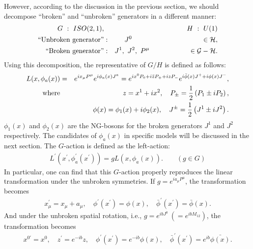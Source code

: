 \documentclass[a4paper,12pt]{article}
\begin{document}
However, according to the discussion in the previous section, 
we should decompose ``broken'' and ``unbroken'' generators in 
a different manner:
\begin{eqnarray}
G~:~ISO(2,1),&& H~:~U(1) \nonumber \\
\textrm{``Unbroken generator''} &:&J^{0} \quad 
\hspace*{3.2cm} \in {\cal H}, \nonumber \\
\textrm{``Broken generator''} &:&J^{1},~J^{2},~P^{\mu} \hspace{2cm}
\in {\cal G-H}.
\end{eqnarray}
Using this decomposition, the representative of $G/H$ is defined as
follows:
\begin{eqnarray}
L(x, \phi_{a}(x)) &=& e^{i x_{\mu} P^{\mu}} e^{i \phi_{a}(x) J^{a}}
= e^{i x^{0} P_{0} + i \bar{z} P_{+} + i z P_{-}} e^{i
\bar{\phi}(x) J^{+} + i \phi(x) J^{-}}, \label{representative} \\
\textrm{where} && z = x^{1} + i x^{2}, \quad P_{\pm} = 
\frac{1}{2} \left(P_{1}\pm i P_{2}\right), \\
&& \hspace{-0.6cm}\phi(x) = \phi_{1}(x)+ i \phi_{2}(x),
\quad J^{\pm} = \frac{1}{2} \left(J^{1}\pm i J^{2}\right).
\end{eqnarray}
$\phi_{1}(x)$ and $\phi_{2}(x)$ are the NG-bosons for the broken
generators $J^{1}$ and $J^{2}$ respectively. The candidates of
$\phi_{a}(x)$ in specific models will be discussed in the next section.
The $G$-action is defined as the left-action:
\begin{eqnarray}
L^{'}(x^{'}, \phi_{a}^{'}(x^{'})) = g L(x, \phi_{a}(x)). \qquad (g
\in G) \label{g-action}
\end{eqnarray}
In particular, one can find that this $G$-action properly 
reproduces the linear transformation under the unbroken symmetries.
If $g = e^{i a_{\mu} P^{\mu}}$, the transformation becomes
\begin{eqnarray} 
x_{\mu}^{'} = x_{\mu} + a_{\mu}, \quad \phi^{'}(x^{'}) = \phi(x),
\quad \bar{\phi}^{'}(x^{'}) = \bar{\phi}(x).
\end{eqnarray}
And under the unbroken spatial rotation, i.e., $g = e^{i b J^{0}}~(= e^{i b
M_{12}})$, the transformation becomes
\begin{eqnarray}
x^{0 '} = x^{0}, \quad z^{'} = e^{-ib} z, \quad \phi^{'}(x^{'}) =
e^{-ib} \phi(x), \quad \bar{\phi}^{'}(x^{'}) = e^{ib} \bar{\phi(x)}.
\end{eqnarray}
\end{document}
